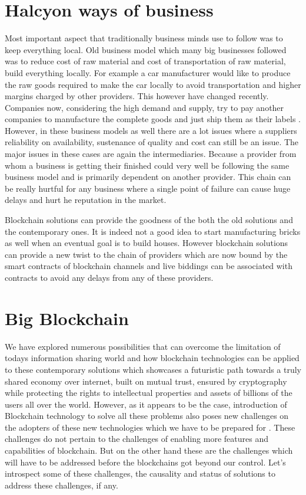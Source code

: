 \section{Halcyon ways of business}
Most important aspect that traditionally business minds use to follow was to keep everything local. Old business model which many big businesses followed was to reduce cost of raw material and cost of transportation of raw material, build everything locally. For example a car manufacturer would like to produce the raw goods required to make the car locally to avoid transportation and higher margins charged by other providers. This however have changed recently. Companies now, considering the high demand and supply, try to pay another companies to manufacture the complete goods and just ship them as their labels \cite{ewan30}. However, in these business models as well there are a lot issues where a suppliers reliability on availability, sustenance of quality and cost can still be an issue. The major issues in these cases are again the intermediaries. Because a provider from whom a business is getting their finished could very well be following the same business model and is primarily dependent on another provider. This chain can be really hurtful for any business where a single point of failure can cause huge delays and hurt he reputation in the market.

Blockchain solutions can provide the goodness of the both the old solutions and the contemporary ones. It is indeed not a good idea to start manufacturing bricks as well when an eventual goal is to build houses. However blockchain solutions can provide a new twist to the chain of providers which are now bound by the smart contracts of blockchain channels and live biddings can be associated with contracts to avoid any delays from any of these providers.


\section{Big Blockchain}
We have explored numerous possibilities that can overcome the limitation of todays information sharing world and how blockchain technologies can be applied to these contemporary solutions which showcases a futuristic path towards a truly shared economy over internet, built on mutual trust, ensured by cryptography while protecting the rights to intellectual properties and assets of billions of the users all over the world. However, as it appears to be the case, introduction of Blockchain technology to solve all these problems also poses new challenges on the adopters of these new technologies which we have to be prepared for \cite{smith31}. These challenges do not pertain to the challenges of enabling more features and capabilities of blockchain. But on the other hand these are the challenges which will have to be addressed before the blockchains got beyond our control. Let's introspect some of these challenges, the causality and status of solutions to address these challenges, if any.

